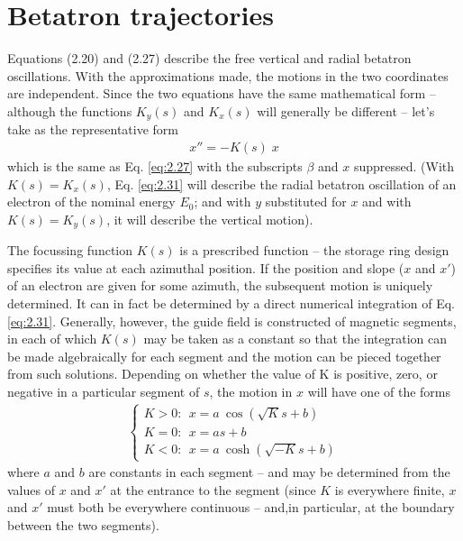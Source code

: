 \section{Betatron trajectories}\label{sec:2.5}

Equations (2.20) and (2.27) describe the free vertical and radial betatron oscillations. With the approximations made, the motions in the two coordinates are independent. Since the two equations have the same mathematical form -- although the functions $K_y(s)$ and $K_x(s)$ will generally be different -- let’s take as the representative form
\begin{align}
	x'' = -K(s) \; x \label{eq:2.31}
\end{align}
which is the same as Eq. \eqref{eq:2.27} with the subscripts $\beta$ and $x$ suppressed. (With $K(s) = K_x(s)$, Eq. \eqref{eq:2.31} will describe the radial betatron oscillation of an electron of the nominal energy $E_0$; and with $y$ substituted for $x$ and with $K(s) = K_y(s)$, it will describe the vertical motion).

The focussing function $K(s)$ is a prescribed function -- the storage ring design specifies its value at each azimuthal position. If the position and slope ($x$ and $x'$) of an electron are given for some azimuth, the subsequent motion is uniquely determined. It can in fact be determined by a direct numerical integration of Eq. \eqref{eq:2.31}. Generally, however, the guide field is constructed of magnetic segments, in each of which $K(s)$ may be taken as a constant so that the integration can be made algebraically for each segment and the motion can be pieced together from such solutions. Depending on whether the value of K is positive, zero, or negative in a particular segment of $s$, the motion in $x$ will have one of the forms
\begin{align}
	\left\{\begin{array}{l}
	K>0: \ \ x = a\ \cos(\sqrt{K}s+b) \\
	K=0: \ \ x = as+b \\
	K<0: \ \ x = a\ \cosh(\sqrt{-K}s+b)
	\end{array}\right. \label{eq:2.32}
\end{align}
where $a$ and $b$ are constants in each segment -- and may be determined from the values of $x$ and $x'$ at the entrance to the segment (since $K$ is everywhere finite, $x$ and $x'$ must both be everywhere continuous -- and,in particular, at the boundary between the two segments).

